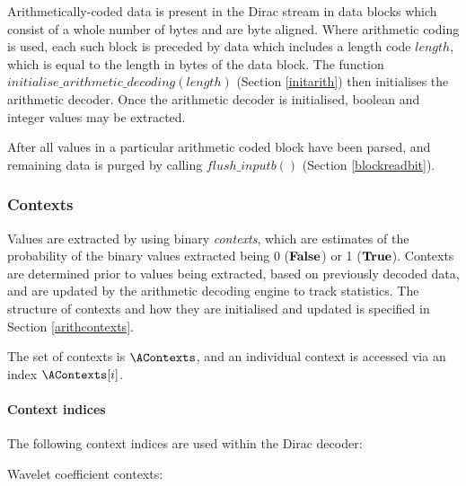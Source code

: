 Arithmetically-coded data is present in the Dirac stream in data blocks which consist of
a whole number of bytes and are byte aligned. Where arithmetic coding is used, each such
block is preceded by data which includes a length code $length$, which is equal to the length in
bytes of the data block. The function $initialise\_arithmetic\_decoding(length)$
(Section \ref{initarith}) then initialises the arithmetic decoder. Once the arithmetic
decoder is initialised, boolean and integer values may be extracted.

After all values in a particular arithmetic coded block have been parsed, and remaining data
is purged by calling $flush\_inputb()$ (Section \ref{blockreadbit}).

\subsubsection{Contexts}


Values are extracted by using binary {\em contexts}, which are estimates of the 
probability of the binary values extracted being 0 ($\text{\bf{False}}$) or 1 ($\text{\bf{True}}$).
Contexts are determined prior to values being extracted, based on previously
decoded data, and are updated by the arithmetic decoding engine to track 
statistics. The structure of contexts and how they are initialised and updated 
is specified in Section \ref{arithcontexts}.

The set of contexts is $\AContexts$, and an individual context is accessed via
an index $\AContexts[i]$. 

\paragraph{Context indices\\}
\label{contextindices}

The following context indices are used within the Dirac decoder:

Wavelet coefficient contexts:

\SignZero\\
\SignPos\\
\SignNeg\\
\ZPZNFollowOne\\
\ZPNNFollowOne\\
\ZPFollowTwo\\
\ZPFollowThree\\
\ZPFollowFour\\
\ZPFollowFive\\
\ZPFollowSixPlus\\
\NPZNFollowOne\\
\NPNNFollowOne\\
\NPFollowTwo\\
\NPFollowThree\\
\NPFollowFour\\
\NPFollowFive\\
\NPFollowSixPlus\\
\CoeffData\\
\ZeroCodeblock\\
\QOffsetFollow\\
\QOffsetData\\
\QOffsetSign\\


